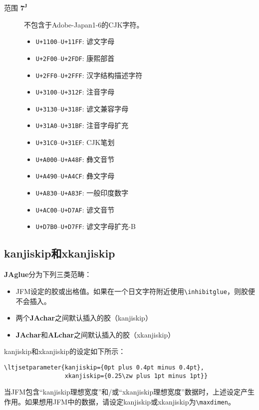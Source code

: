 \documentclass{ltjarticle}
\begin{document}
\begin{description}
\item[范围 $\mathbf{7^J}$] 不包含于Adobe-Japan1-6的CJK字符。
\begin{multicols}{2}
	\begin{itemize}
	\item \texttt{U+1100}--\texttt{U+11FF}: 谚文字母
	\item \texttt{U+2F00}--\texttt{U+2FDF}: 康熙部首
	\item \texttt{U+2FF0}--\texttt{U+2FFF}: 汉字结构描述字符
	\item \texttt{U+3100}--\texttt{U+312F}: 注音字母
	\item \texttt{U+3130}--\texttt{U+318F}: 谚文兼容字母
	\item \texttt{U+31A0}--\texttt{U+31BF}: 注音字母扩充
	\item \texttt{U+31C0}--\texttt{U+31EF}: CJK笔划
	\item \texttt{U+A000}--\texttt{U+A48F}: 彝文音节
	\item \texttt{U+A490}--\texttt{U+A4CF}: 彝文字母
	\item \texttt{U+A830}--\texttt{U+A83F}: 一般印度数字
	\item \texttt{U+AC00}--\texttt{U+D7AF}: 谚文音节
	\item \texttt{U+D7B0}--\texttt{U+D7FF}: 谚文字母扩充-B
	\end{itemize}
\end{multicols}
\end{description}
\subsection{\textsf{kanjiskip}和\textsf{xkanjiskip}}
\textbf{JAglue}分为下列三类范畴：
\begin{itemize}
\item JFM设定的胶或出格值。如果在一个日文字符附近使用\verb!\inhibitglue!，则胶便不会插入。
\item 两个\textbf{JAchar}之间默认插入的胶（\textsf{kanjiskip}）
\item \textbf{JAchar}和\textbf{ALchar}之间默认插入的胶（\textsf{xkanjiskip}）
\end{itemize}

\textsf{kanjiskip}和\textsf{xkanjiskip}的设定如下所示：
\begin{verbatim}
\ltjsetparameter{kanjiskip={0pt plus 0.4pt minus 0.4pt},
                 xkanjiskip={0.25\zw plus 1pt minus 1pt}}
\end{verbatim}

当JFM包含“\textsf{kanjiskip}理想宽度”和/或“\textsf{xkanjiskip}理想宽度”数据时，上述设定产生作用。如果想用JFM中的数据，请设定\textsf{kanjiskip}或\textsf{xkanjiskip}为\verb!\maxdimen!。
\end{document}
